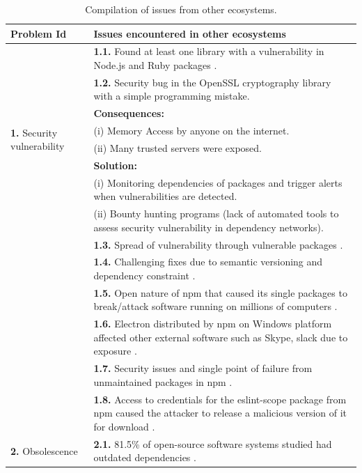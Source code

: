 \documentclass[conference]{IEEEtran}
\begin{document}
\begin{table}[!t]
    \caption{Compilation of issues from other ecosystems.}
    \label{tab:compiled_issues}
    \begin{tabular}{|p{3cm}|p{14cm}|}
        \hline
        \textbf{Problem Id} & \textbf{Issues encountered in other ecosystems} \\
        \hline
        \multirow{8}{*}{\textbf{1.} Security vulnerability} &  \textbf{1.1.} Found at least one library with a vulnerability in Node.js and Ruby packages \cite{decan2018impact}.\\
							&  \textbf{1.2.} Security bug in the OpenSSL cryptography library \cite{decan2018impact} with a simple programming mistake. \\							&  \textbf{Consequences:}\\
							&  (i) Memory Access by anyone on the internet.\\
							&  (ii) Many trusted servers were exposed. \\
							&  \textbf{Solution:}\\
							&  (i) Monitoring  dependencies of packages and trigger alerts when vulnerabilities are detected.\\
							&  (ii) Bounty hunting programs (lack of automated tools to assess security vulnerability in dependency networks).\\
							&  \textbf{1.3.} Spread of vulnerability  through vulnerable packages \cite{decan2018impact}.  \\
							&  \textbf{1.4.} Challenging fixes due to semantic versioning and dependency constraint \cite{decan2018impact}.\\
							&  \textbf{1.5.} Open nature of npm that caused its single packages to break/attack software running on millions of computers \cite{zimmermann2019small}.\\
							&  \textbf{1.6.} Electron distributed by npm on Windows platform affected other external software such as Skype,  slack due to exposure \cite{decan2018impact}. \\
							&  \textbf{1.7.} Security issues and single point of failure from unmaintained packages in npm \cite{zimmermann2019small}.\\
							&  \textbf{1.8.} Access to credentials for the eslint-scope package from npm  caused the attacker to release a malicious version of it for download \cite{zimmermann2019small}.  \\			
        \hline
        \multirow{7}{*}{\textbf{2.} Obsolescence} &\textbf{2.1.} 81.5\% of open-source software systems studied had outdated dependencies \cite{decan2018impact}.  \\

\end{tabular}
\end{table}
\end{document}
